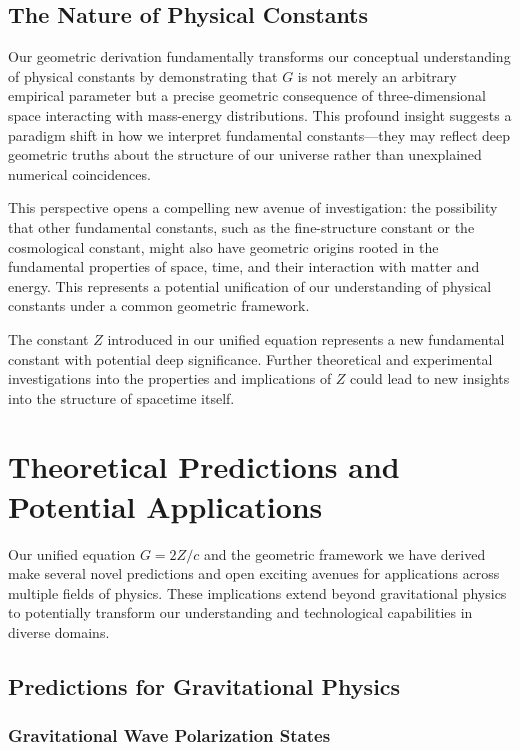 \documentclass[12pt]{article}
\numberwithin{equation}{section}
\begin{document}
\subsection{The Nature of Physical Constants}

Our geometric derivation fundamentally transforms our conceptual understanding of physical constants by demonstrating that $G$ is not merely an arbitrary empirical parameter but a precise geometric consequence of three-dimensional space interacting with mass-energy distributions. This profound insight suggests a paradigm shift in how we interpret fundamental constants—they may reflect deep geometric truths about the structure of our universe rather than unexplained numerical coincidences.

This perspective opens a compelling new avenue of investigation: the possibility that other fundamental constants, such as the fine-structure constant or the cosmological constant, might also have geometric origins rooted in the fundamental properties of space, time, and their interaction with matter and energy. This represents a potential unification of our understanding of physical constants under a common geometric framework.

The constant $Z$ introduced in our unified equation represents a new fundamental constant with potential deep significance. Further theoretical and experimental investigations into the properties and implications of $Z$ could lead to new insights into the structure of spacetime itself.

\section{Theoretical Predictions and Potential Applications}
\label{sec:predictions_applications}

Our unified equation $G = 2Z/c$ and the geometric framework we have derived make several novel predictions and open exciting avenues for applications across multiple fields of physics. These implications extend beyond gravitational physics to potentially transform our understanding and technological capabilities in diverse domains.

\subsection{Predictions for Gravitational Physics}

\subsubsection{Gravitational Wave Polarization States}
\end{document}
